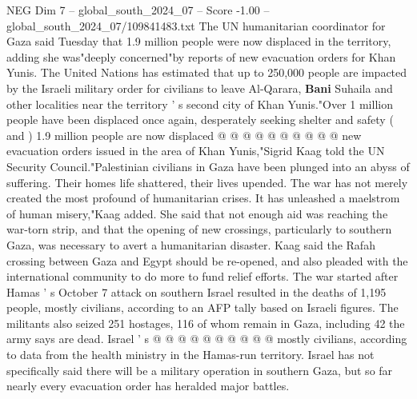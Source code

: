 \begin{textsample}{NEG Dim 7 – global\_south\_2024\_07 – Score -1.00 – global\_south\_2024\_07/109841483.txt}
The UN humanitarian coordinator for Gaza said Tuesday that 1.9 million people were now displaced in the territory, adding she was"deeply concerned"by reports of new evacuation orders for Khan Yunis.
The United Nations has estimated that up to 250,000 people are impacted by the Israeli military order for civilians to leave Al-Qarara, \textbf{Bani} Suhaila and other localities near the territory ' s second city of Khan Yunis."Over 1 million people have been displaced once again, desperately seeking shelter and safety ( and ) 1.9 million people are now displaced @ @ @ @ @ @ @ @ @ @ new evacuation orders issued in the area of Khan Yunis,"Sigrid Kaag told the UN Security Council."Palestinian civilians in Gaza have been plunged into an abyss of suffering.
Their homes life shattered, their lives upended.
The war has not merely created the most profound of humanitarian crises.
It has unleashed a maelstrom of human misery,"Kaag added.
She said that not enough aid was reaching the war-torn strip, and that the opening of new crossings, particularly to southern Gaza, was necessary to avert a humanitarian disaster.
Kaag said the Rafah crossing between Gaza and Egypt should be re-opened, and also pleaded with the international community to do more to fund relief efforts.
The war started after Hamas ' s October 7 attack on southern Israel resulted in the deaths of 1,195 people, mostly civilians, according to an AFP tally based on Israeli figures.
The militants also seized 251 hostages, 116 of whom remain in Gaza, including 42 the army says are dead.
Israel ' s @ @ @ @ @ @ @ @ @ @ mostly civilians, according to data from the health ministry in the Hamas-run territory.
Israel has not specifically said there will be a military operation in southern Gaza, but so far nearly every evacuation order has heralded major battles.

\end{textsample}
